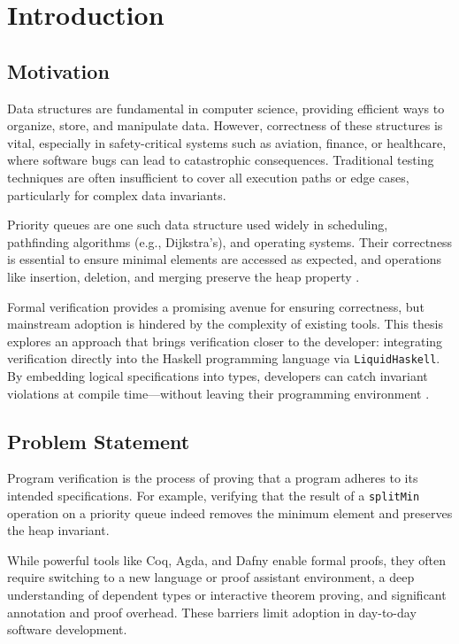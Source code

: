 \chapter{Introduction} %

\section{ Motivation }
Data structures are fundamental in computer science, providing efficient ways to organize, store, and manipulate data.
However, correctness of these structures is vital, especially in safety-critical systems such as aviation, finance, or healthcare, where software bugs can lead to catastrophic consequences.
Traditional testing techniques are often insufficient to cover all execution paths or edge cases, particularly for complex data invariants.

Priority queues are one such data structure used widely in scheduling, pathfinding algorithms (e.g., Dijkstra’s), and operating systems.
Their correctness is essential to ensure minimal elements are accessed as expected, and operations like insertion, deletion, and merging preserve the heap property \cite{okasaki}.

Formal verification provides a promising avenue for ensuring correctness, but mainstream adoption is hindered by the complexity of existing tools.
This thesis explores an approach that brings verification closer to the developer:
integrating verification directly into the Haskell programming language via \texttt{LiquidHaskell}.
By embedding logical specifications into types, developers can catch invariant violations at compile time—without leaving their programming environment \cite{rondonLiquidTypes2008}.

\section{ Problem Statement }
Program verification is the process of proving that a program adheres to its intended specifications.
For example, verifying that the result of a \texttt{splitMin} operation on a priority queue indeed removes the minimum element and preserves the heap invariant.

While powerful tools like Coq, Agda, and Dafny enable formal proofs,
they often require switching to a new language or proof assistant environment,
a deep understanding of dependent types or interactive theorem proving, and significant annotation and proof overhead.
These barriers limit adoption in day-to-day software development.

